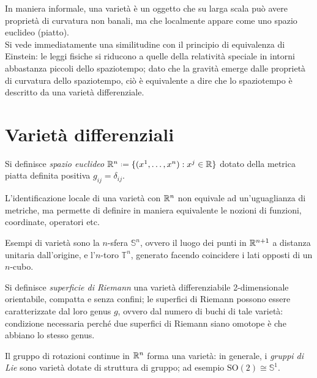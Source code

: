 
In maniera informale, una varietà è un oggetto che su larga scala può avere proprietà di curvatura non banali, ma che localmente appare come uno spazio euclideo (piatto).\\
Si vede immediatamente una similitudine con il principio di equivalenza di Einstein: le leggi fisiche si riducono a quelle della relatività speciale in intorni abbastanza piccoli dello spaziotempo; dato che la gravità emerge dalle proprietà di curvatura dello spaziotempo, ciò è equivalente a dire che lo spaziotempo è descritto da una varietà differenziale.

\section{Varietà differenziali}

\begin{definition}
	Si definisce \textit{spazio euclideo} $ \R^n \defeq \{(x^1,\dots,x^n) : x^j \in \R\} $ dotato della metrica piatta definita positiva $ g_{ij} = \delta_{ij} $.
\end{definition}

L'identificazione locale di una varietà con $ \mathbb{R}^n $ non equivale ad un'uguaglianza di metriche, ma permette di definire in maniera equivalente le nozioni di funzioni, coordinate, operatori etc.

\begin{example}
	Esempi di varietà sono la $ n $-sfera $ \mathbb{S}^n $, ovvero il luogo dei punti in $ \mathbb{R}^{n+1} $ a distanza unitaria dall'origine, e l'$ n $-toro $ \mathbb{T}^n $, generato facendo coincidere i lati opposti di un $ n $-cubo.
\end{example}
\begin{example}
	Si definisce \textit{superficie di Riemann} una varietà differenziabile 2-dimensionale orientabile, compatta e senza confini; le superfici di Riemann possono essere caratterizzate dal loro genus $ g $, ovvero dal numero di buchi di tale varietà: condizione necessaria perché due superfici di Riemann siano omotope è che abbiano lo stesso genus.
\end{example}
\begin{example}
	Il gruppo di rotazioni continue in $ \mathbb{R}^n $ forma una varietà: in generale, i \textit{gruppi di Lie} sono varietà dotate di struttura di gruppo; ad esempio $ \text{SO}(2) \cong \mathbb{S}^1 $.
\end{example}

